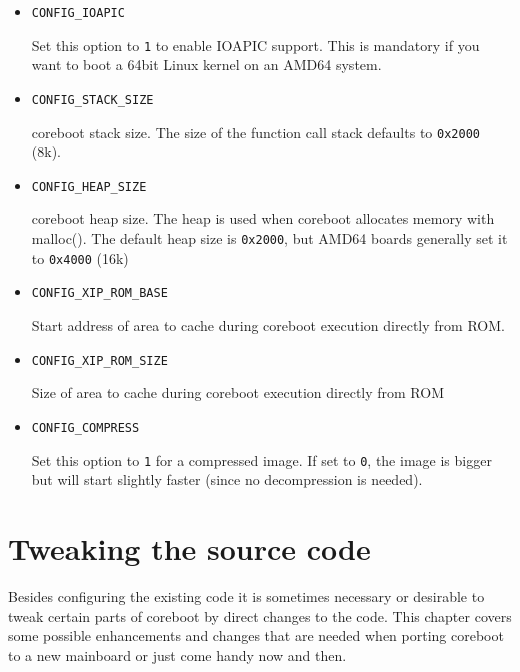 \documentclass[titlepage,12pt]{article}
\begin{document}
\begin{itemize}
\item \begin{verbatim}CONFIG_IOAPIC\end{verbatim}

Set this option to \texttt{1} to enable IOAPIC support. This is
mandatory if you want to boot a 64bit Linux kernel on an AMD64 system.

\item \begin{verbatim}CONFIG_STACK_SIZE\end{verbatim}

coreboot stack size. The size of the function call stack defaults to
\texttt{0x2000} (8k).

\item \begin{verbatim}CONFIG_HEAP_SIZE\end{verbatim}

coreboot heap size. The heap is used when coreboot allocates memory
with malloc(). The default heap size is \texttt{0x2000}, but AMD64 boards
generally set it to \texttt{0x4000} (16k)

\item \begin{verbatim}CONFIG_XIP_ROM_BASE\end{verbatim}

Start address of area to cache during coreboot execution directly from
ROM.

\item \begin{verbatim}CONFIG_XIP_ROM_SIZE\end{verbatim}

Size of area to cache during coreboot execution directly from ROM

\item \begin{verbatim}CONFIG_COMPRESS\end{verbatim}

Set this option to \texttt{1} for a compressed image. If set to
\texttt{0}, the image is bigger but will start slightly faster (since no
decompression is needed).

\end{itemize}


\newpage

%
%

\section{Tweaking the source code}
Besides configuring the existing code it is sometimes necessary or
desirable to tweak certain parts of coreboot by direct changes to the
code. This chapter covers some possible enhancements and changes that
are needed when porting coreboot to a new mainboard or just come
handy now and then.
\end{document}
